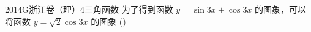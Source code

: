 
\begin{problem}{2014}{G}{浙江卷（理）}{4}{三角函数}
为了得到函数 $ y=\sin 3x+\cos 3x $ 的图象，可以将函数 $ y=\sqrt{2}\cos 3x $ 的图象 (\hspace{1cm})
\begin{choices}
\end{choices}
\end{problem}

\begin{answer}

\end{answer}

\begin{solutions}

\end{solutions}